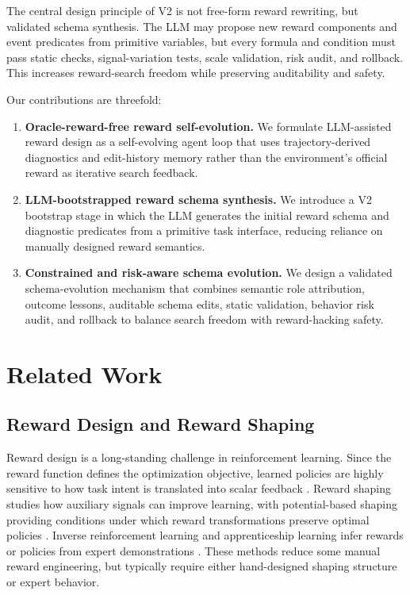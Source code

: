 \documentclass[11pt]{article}
\begin{document}
The central design principle of V2 is not free-form reward rewriting, but validated schema synthesis. The LLM may propose new reward components and event predicates from primitive variables, but every formula and condition must pass static checks, signal-variation tests, scale validation, risk audit, and rollback. This increases reward-search freedom while preserving auditability and safety.

Our contributions are threefold:
\begin{enumerate}[leftmargin=*,nosep]
    \item \textbf{Oracle-reward-free reward self-evolution.} We formulate LLM-assisted reward design as a self-evolving agent loop that uses trajectory-derived diagnostics and edit-history memory rather than the environment's official reward as iterative search feedback.
    \item \textbf{LLM-bootstrapped reward schema synthesis.} We introduce a V2 bootstrap stage in which the LLM generates the initial reward schema and diagnostic predicates from a primitive task interface, reducing reliance on manually designed reward semantics.
    \item \textbf{Constrained and risk-aware schema evolution.} We design a validated schema-evolution mechanism that combines semantic role attribution, outcome lessons, auditable schema edits, static validation, behavior risk audit, and rollback to balance search freedom with reward-hacking safety.
\end{enumerate}

\section{Related Work}
\label{sec:related}

\subsection{Reward Design and Reward Shaping}

Reward design is a long-standing challenge in reinforcement learning. Since the reward function defines the optimization objective, learned policies are highly sensitive to how task intent is translated into scalar feedback \citep{sutton2018reinforcement}. Reward shaping studies how auxiliary signals can improve learning, with potential-based shaping providing conditions under which reward transformations preserve optimal policies \citep{ng1999policy}. Inverse reinforcement learning and apprenticeship learning infer rewards or policies from expert demonstrations \citep{ng2000irl,abbeel2004apprenticeship}. These methods reduce some manual reward engineering, but typically require either hand-designed shaping structure or expert behavior.
\end{document}
